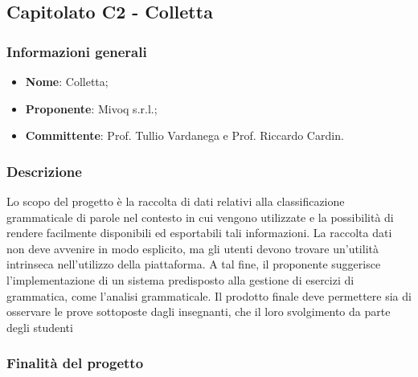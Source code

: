 \subsection{Capitolato C2 - Colletta}
\subsubsection{Informazioni generali}
\begin{itemize}
	\item \textbf{Nome}: Colletta;
	\item \textbf{Proponente}: Mivoq s.r.l.;
	\item \textbf{Committente}: Prof. Tullio Vardanega e Prof. Riccardo Cardin.
\end{itemize}
\subsubsection{Descrizione}
Lo scopo del progetto è la raccolta di dati relativi alla 
classificazione grammaticale di parole nel contesto in cui vengono utilizzate e 
la possibilità di rendere facilmente disponibili ed esportabili tali 
informazioni.
La raccolta dati non deve avvenire in modo esplicito, ma gli utenti 
devono trovare un'utilità intrinseca nell'utilizzo della piattaforma. A tal fine,
il proponente suggerisce l'implementazione di un sistema predisposto alla gestione
di esercizi di grammatica, come l'analisi grammaticale. Il prodotto finale deve 
permettere sia di osservare le prove sottoposte dagli insegnanti, che il loro 
svolgimento da parte degli studenti

\subsubsection{Finalità del progetto}

